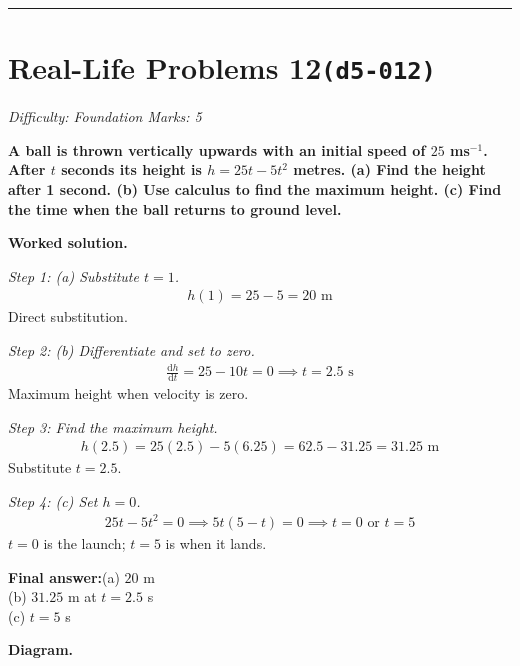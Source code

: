 \documentclass[11pt]{article}
\newcommand{\question}[1]{\par\medskip\noindent\textbf{#1}\par}
\begin{document}
\medskip\hrule

\section*{Real-Life Problems 12\quad\small\texttt{(d5-012)}}
\textit{Difficulty: Foundation \quad\textbar\quad Marks: 5}

\question{A ball is thrown vertically upwards with an initial speed of \( 25 \) ms\(^{-1}\). After \( t \) seconds its height is \( h = 25t - 5t^2 \) metres. (a) Find the height after 1 second. (b) Use calculus to find the maximum height. (c) Find the time when the ball returns to ground level.}

\textbf{Worked solution.}

\textit{Step 1: (a) Substitute \( t = 1 \).}
\[\begin{gathered}
h(1) = 25 - 5 = 20 \text{ m}
\end{gathered}\]
Direct substitution.

\textit{Step 2: (b) Differentiate and set to zero.}
\[\begin{gathered}
\frac{\mathrm{d}h}{\mathrm{d}t} = 25 - 10t = 0 \implies t = 2.5 \text{ s}
\end{gathered}\]
Maximum height when velocity is zero.

\textit{Step 3: Find the maximum height.}
\[\begin{gathered}
h(2.5) = 25(2.5) - 5(6.25) = 62.5 - 31.25 = 31.25 \text{ m}
\end{gathered}\]
Substitute \( t = 2.5 \).

\textit{Step 4: (c) Set \( h = 0 \).}
\[\begin{gathered}
25t - 5t^2 = 0 \implies 5t(5 - t) = 0 \implies t = 0 \text{ or } t = 5
\end{gathered}\]
\( t = 0 \) is the launch; \( t = 5 \) is when it lands.

\begin{answerbox}
\textbf{Final answer:}\quad (a) \(\displaystyle  20 \) m \\[3pt]  (b) \(\displaystyle  31.25 \) m at \(\displaystyle  t = 2.5 \) s \\[3pt]  (c) \(\displaystyle  t = 5 \) s
\end{answerbox}
\textbf{Diagram.}
\end{document}
